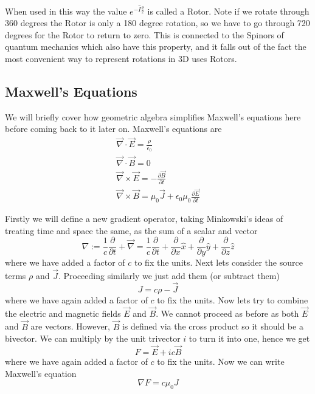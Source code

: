 \documentclass[options]{report}
\def \xhat{\hat{x}}
\def \yhat{\hat{y}}
\def \zhat{\hat{z}}
\def \E{\vec{E}}
\def \B{\vec{B}}
\def \J{\vec{J}}
\def \grad{\vec{\nabla}}
\begin{document}
When used in this way the value $e^{-\hat{I} \frac{\theta}{2}}$ is called a Rotor. Note if we rotate through 360 degrees the Rotor is only a 180 degree rotation, so we have to go through 720 degrees for the Rotor to return to zero. This is connected to the Spinors of quantum mechanics which also have this property, and it falls out of the fact the most convenient way to represent rotations in 3D uses Rotors.

\subsection{Maxwell's Equations}
We will briefly cover how geometric algebra simplifies Maxwell's equations here before coming back to it later on. Maxwell's equations are
\begin{equation*}
	\begin{gathered}
		\grad \cdot \E = \frac{\rho}{\epsilon_0} \\
		\grad \cdot \B = 0 \\
		\grad \times \E = -\frac{\partial \B}{\partial t} \\
		\grad \times \B = \mu_0 \J + \epsilon_0 \mu_0 \frac{\partial \E}{\partial t}
	\end{gathered}
\end{equation*}

Firstly we will define a new gradient operator, taking Minkowski's ideas of treating time and space the same, as the sum of a scalar and vector
\begin{equation*}
	\nabla := \frac{1}{c} \frac{\partial}{\partial t} + \grad = \frac{1}{c} \frac{\partial}{\partial t} + \frac{\partial}{\partial x}\xhat + \frac{\partial}{\partial y}\yhat + \frac{\partial}{\partial z}\zhat
\end{equation*}
where we have added a factor of $c$ to fix the units. Next lets consider the source terms $\rho$ and $\J$. Proceeding similarly we just add them (or subtract them)
\begin{equation*}
	J = c\rho - \J
\end{equation*}
where we have again added a factor of $c$ to fix the units. Now lets try to combine the electric and magnetic fields $\E$ and $\B$. We cannot proceed as before as both $\E$ and $\B$ are vectors. However, $\B$ is defined via the cross product so it should be a bivector. We can multiply by the unit trivector $i$ to turn it into one, hence we get
\begin{equation}
	F = \E + i c\B
\end{equation}
where we have again added a factor of $c$ to fix the units. Now we can write Maxwell's equation
\begin{equation*}
	\nabla F = c \mu_0 J
\end{equation*}
\end{document}
